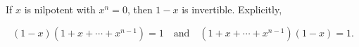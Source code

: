 If $x$ is nilpotent with $x^n = 0$, then $1 - x$ is invertible. Explicitly,

$$(1 - x)(1 + x + \cdots + x^{n-1}) = 1 \quad \text{and} \quad (1 + x + \cdots + x^{n-1})(1 - x) = 1.$$
